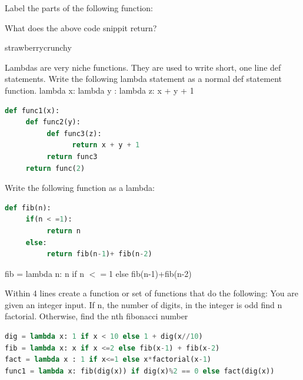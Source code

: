 \documentclass{article}
\begin{document}
\newpage
{}
\begin{subq}
 \subqs Label the parts of the following function: 
 
  \bigskip
 
\begin{solution}


 \end{solution}
 \subqs What does the above code snippit return? 
 \begin{solution}
 strawberrycrunchy
 \end{solution}
\end{subq}
\begin{subq}
\subqs Lambdas are very niche functions. They are used to write short, one line def statements.  Write the following lambda statement as a normal def statement function. lambda x:  lambda y : lambda z: x + y + 1
\begin{solution}
\begin{lstlisting}[language = Python]
def func1(x):
     def func2(y):
          def func3(z):
                return x + y + 1
          return func3
     return func(2)
\end{lstlisting}\end{solution}

\subqs Write the following function as a lambda: 
\begin{lstlisting}[language = Python]
def fib(n):
     if(n < =1):
          return n
     else:
          return fib(n-1)+ fib(n-2)
\end{lstlisting}
\begin{solution}
fib = lambda n: n if n $<=$1 else fib(n-1)+fib(n-2)

\end{solution}
\subqs Within 4 lines create a function or set of functions that do the following: 
You are given an integer input. If n, the number of digits, in the integer is odd find n factorial. Otherwise, find the nth fibonacci number
\begin{solution}
\begin{lstlisting}[language = Python]
dig = lambda x: 1 if x < 10 else 1 + dig(x//10)
fib = lambda x: x if x <=2 else fib(x-1) + fib(x-2)
fact = lambda x : 1 if x<=1 else x*factorial(x-1)
func1 = lambda x: fib(dig(x)) if dig(x)%2 == 0 else fact(dig(x))
\end{lstlisting}
\end{solution}
\end{subq}
\newpage
\end{document}
